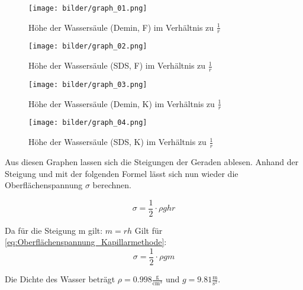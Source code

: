             \begin{figure}[H]
                \centering
                \caption{Höhe der Wassersäule (Demin, F) im Verhältnis zu $\frac{1}{r}$}
                \texttt{[image: bilder/graph\_01.png]}
                \label{fig:Versuch3_Graph1}
            \end{figure}

            \begin{figure}[H]
                \centering
                \caption{Höhe der Wassersäule (SDS, F) im Verhältnis zu $\frac{1}{r}$}
                \texttt{[image: bilder/graph\_02.png]}
                \label{fig:Versuch3_Graph2}
            \end{figure}

            \begin{figure}[H]
                \centering
                \caption{Höhe der Wassersäule (Demin, K) im Verhältnis zu $\frac{1}{r}$}
                \texttt{[image: bilder/graph\_03.png]}
                \label{fig:Versuch3_Graph3}
            \end{figure}

            \begin{figure}[H]
                \centering
                \caption{Höhe der Wassersäule (SDS, K) im Verhältnis zu $\frac{1}{r}$}
                \texttt{[image: bilder/graph\_04.png]}
                \label{fig:Versuch3_Graph4}
            \end{figure}

            Aus diesen Graphen lassen sich die Steigungen der Geraden ablesen. Anhand der Steigung und mit der folgenden Formel lässt sich nun wieder die Oberflächenspannung $\sigma$ berechnen.

            \begin{equation}
                \sigma = \frac{1}{2} \cdot \rho g h r
                \label{eq:Oberflächenspannung_Kapillarmethode}
            \end{equation}

            Da für die Steigung m gilt:
            $m = r h$
            Gilt für \ref{eq:Oberflächenspannung_Kapillarmethode}:
            \begin{equation}
                \sigma = \frac{1}{2} \cdot \rho g m
                \label{eq:Oberflächenspannung_Kapillarmethode_2}
            \end{equation}

            Die Dichte des Wasser beträgt $\rho = 0.998 \frac{\mathrm{g}}{\mathrm{cm^3}}$ und $g = 9.81 \frac{\mathrm{m}}{\mathrm{s^2}}$.


